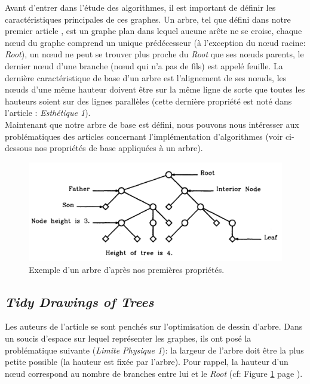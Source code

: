 \documentclass{article}
\begin{document}
Avant d'entrer dans l'étude des algorithmes, il est important de définir les caractéristiques principales de ces graphes. Un arbre, tel que défini dans notre premier article \cite{article79}, est un graphe plan dans lequel aucune arête ne se croise, chaque n\oe{}ud du graphe comprend un unique prédécesseur (à l'exception du n\oe{}ud racine: \emph{Root}), un n\oe{}ud ne peut se trouver plus proche du \emph{Root} que ses n\oe{}uds parents, le dernier n\oe{}ud d'une branche (n\oe{}ud qui n'a pas de fils) est appelé feuille. La dernière caractéristique de base d'un arbre est l'alignement de ses n\oe{}uds, les n\oe{}uds d’une même hauteur doivent être sur la même ligne de sorte que toutes les hauteurs soient sur des lignes parallèles (cette dernière propriété est noté dans l'article \cite{article79}: \emph{Esthétique 1}).\\

Maintenant que notre arbre de base est défini, nous pouvons nous intéresser aux problématiques des articles concernant l'implémentation d'algorithmes (voir ci-dessous nos propriétés de base appliquées à un arbre).\\

\vfill
\begin{figure}[h]
		\begin{center}
			\includegraphics[scale=0.4]{arbre.png}
		\end{center}
	\caption{Exemple d'un arbre d'après nos premières propriétés. \cite{article79}}
  \label{fig:arbre}
\end{figure}
\vfill

\newpage
  \subsection{\emph{Tidy Drawings of Trees}}

  Les auteurs de l'article se sont penchés sur l'optimisation de dessin d'arbre. Dans un soucis d'espace sur lequel représenter les graphes, ils ont posé la problématique suivante (\emph{Limite Physique 1}):  la largeur de l’arbre doit être la plus petite possible (la hauteur est fixée par l’arbre). Pour rappel, la hauteur d'un n\oe{}ud correspond au nombre de branches entre lui et le \emph{Root} (cf: Figure \ref{fig:arbre} page \pageref{fig:arbre}).
\end{document}
